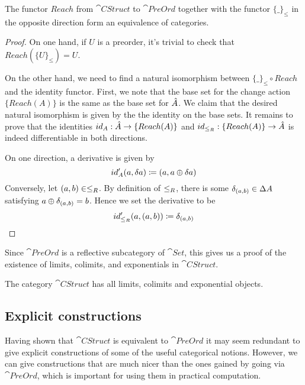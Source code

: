 \begin{thm}
  The functor $Reach$ from $\cat{CStruct}$ to $\cat{PreOrd}$ together with the
  functor $\{\_\}_\leq$ in the opposite direction form an equivalence of categories.
\end{thm}
\ifproofs
\begin{proof}
  On one hand, if $U$ is a preorder, it's trivial to check that $Reach (\{U\}_\leq) = U$.

  On the other hand, we need to find a natural isomorphism between $\{\_\}_\leq \circ Reach$
  and the identity functor. First, we note that the base set for the change action $\{Reach(A)\}$ is
  the same as the base set for $\hat{A}$. We claim that the desired natural isomorphism is given by the
  the identity on the base sets. It remains to prove that the identities
  $id_A : \hat{A} \rightarrow \{Reach(A)\}$ and $id_{\leq_R} : \{Reach(A)\} \rightarrow \hat{A}$
  is indeed differentiable in both directions.

  On one direction, a derivative is given by
  $$
    id'_A(a, \delta a) \coloneqq (a, a \oplus \delta a)
  $$
  Conversely, let $(a, b) \in \leq_R$. By definition of $\leq_R$, there is some
  $\delta_{(a, b)} \in \Delta A$ satisfying $a \oplus \delta_{(a,b)} = b$. Hence we set the
  derivative to be
  $$
    id'_{\leq_R}(a, (a, b)) \coloneqq \delta_{(a, b)}
  $$
\end{proof}
\fi

Since $\cat{PreOrd}$ is a reflective subcategory of $\cat{Set}$, this gives us a proof
of the existence of limits, colimits, and exponentials in $\cat{CStruct}$.

\begin{corollary}
  The category $\cat{CStruct}$ has all limits, colimits and exponential objects.
\end{corollary}

\subsection{Explicit constructions}

Having shown that $\cat{CStruct}$ is equivalent to $\cat{PreOrd}$ it may seem
redundant to give explicit constructions of some of the useful categorical
notions. However, we can give constructions that are much nicer than the ones
gained by going via $\cat{PreOrd}$, which is important for using them in
practical computation.


